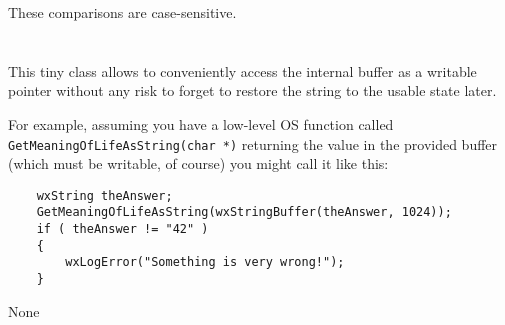 










These comparisons are case-sensitive.


\section{}\label{wxstringbuffer}

This tiny class allows to conveniently access the  
internal buffer as a writable pointer without any risk to forget to restore
the string to the usable state later.

For example, assuming you have a low-level OS function called 
{\tt GetMeaningOfLifeAsString(char *)} returning the value in the provided
buffer (which must be writable, of course) you might call it like this:

\begin{verbatim}
    wxString theAnswer;
    GetMeaningOfLifeAsString(wxStringBuffer(theAnswer, 1024));
    if ( theAnswer != "42" )
    {
        wxLogError("Something is very wrong!");
    }
\end{verbatim}


None


